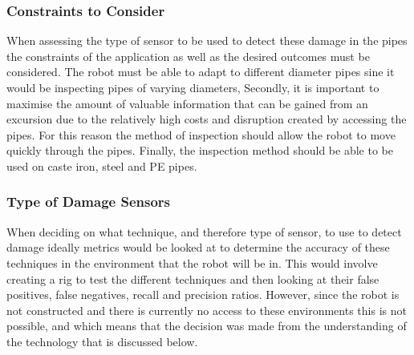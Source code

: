 \documentclass[11pt]{article}		%
\begin{document}
	        \subsubsection{Constraints to Consider}
	        
	       When assessing the type of sensor to be used to detect these damage in the pipes the constraints of the application as well as the desired outcomes must be considered. 
	        The robot must be able to adapt to different diameter pipes sine it would be inspecting pipes of varying diameters, 
	        Secondly, it is important to maximise the amount of valuable information that can be gained from an excursion due to the relatively high costs and disruption created by accessing the pipes.
	        For this reason the method of inspection should allow the robot to move quickly through the pipes. 
	        Finally, the inspection method should be able to be used on caste iron, steel and PE pipes. 
	
	        \subsubsection{Type of Damage Sensors}
	        
        When deciding on what technique, and therefore type of sensor, to use to detect damage ideally metrics would be looked at to determine the accuracy of these techniques in the environment that the robot will be in. This would involve creating a rig to test the different techniques and then looking at their false positives, false negatives, recall and precision ratios. However, since the robot is not constructed and there is currently no access to these environments this is not possible, and which means that the decision was made from the understanding of the technology that is discussed below.
\end{document}
